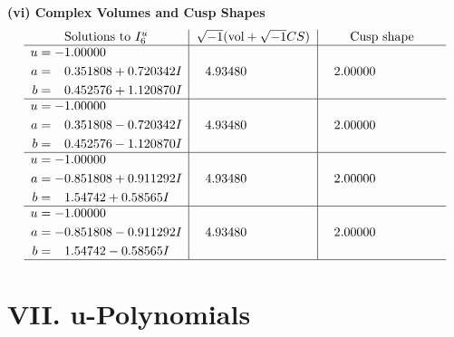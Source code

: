 \documentclass[1p]{elsarticle_modified}
\theoremstyle{definition}
\newcommand{\I}{\sqrt{-1}}
\begin{document}
\newpage\flushleft \textbf{(vi) Complex Volumes and Cusp Shapes}
$$\begin{array}{c|c|c}  
\text{Solutions to }I^u_{6}& \I (\text{vol} + \sqrt{-1}CS) & \text{Cusp shape}\\
 \hline 
\begin{aligned}
u &= -1.00000\phantom{ +0.000000I} \\
a &= \phantom{-}0.351808 + 0.720342 I \\
b &= \phantom{-}0.452576 + 1.120870 I\end{aligned}
 & \phantom{-}4.93480\phantom{ +0.000000I} & \phantom{-}2.00000\phantom{ +0.000000I} \\ \hline\begin{aligned}
u &= -1.00000\phantom{ +0.000000I} \\
a &= \phantom{-}0.351808 - 0.720342 I \\
b &= \phantom{-}0.452576 - 1.120870 I\end{aligned}
 & \phantom{-}4.93480\phantom{ +0.000000I} & \phantom{-}2.00000\phantom{ +0.000000I} \\ \hline\begin{aligned}
u &= -1.00000\phantom{ +0.000000I} \\
a &= -0.851808 + 0.911292 I \\
b &= \phantom{-}1.54742 + 0.58565 I\end{aligned}
 & \phantom{-}4.93480\phantom{ +0.000000I} & \phantom{-}2.00000\phantom{ +0.000000I} \\ \hline\begin{aligned}
u &= -1.00000\phantom{ +0.000000I} \\
a &= -0.851808 - 0.911292 I \\
b &= \phantom{-}1.54742 - 0.58565 I\end{aligned}
 & \phantom{-}4.93480\phantom{ +0.000000I} & \phantom{-}2.00000\phantom{ +0.000000I}\\
 \hline 
 \end{array}$$\newpage
\newpage\renewcommand{\arraystretch}{1}
\centering \section*{ VII. u-Polynomials}
\end{document}
